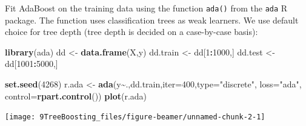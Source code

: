 \documentclass[
  10pt,
  ignorenonframetext,
]{beamer}
\newenvironment{Shaded}{\begin{snugshade}}{\end{snugshade}}
\newcommand{\AttributeTok}[1]{\textcolor[rgb]{0.13,0.29,0.53}{#1}}
\newcommand{\DecValTok}[1]{\textcolor[rgb]{0.00,0.00,0.81}{#1}}
\newcommand{\FunctionTok}[1]{\textcolor[rgb]{0.13,0.29,0.53}{\textbf{#1}}}
\newcommand{\NormalTok}[1]{#1}
\newcommand{\OtherTok}[1]{\textcolor[rgb]{0.56,0.35,0.01}{#1}}
\newcommand{\SpecialCharTok}[1]{\textcolor[rgb]{0.81,0.36,0.00}{\textbf{#1}}}
\newcommand{\StringTok}[1]{\textcolor[rgb]{0.31,0.60,0.02}{#1}}
\begin{document}
\begin{frame}[fragile]
Fit AdaBoost on the training data using the function \texttt{ada()} from
the \texttt{ada} R package. The function uses classification trees as
weak learners. We use default choice for tree depth (tree depth is
decided on a case-by-case basis):

\vspace{2mm}

\scriptsize
\centering

\begin{Shaded}
\begin{Highlighting}[]
\FunctionTok{library}\NormalTok{(ada)}
\NormalTok{dd }\OtherTok{\textless{}{-}} \FunctionTok{data.frame}\NormalTok{(X,y)}
\NormalTok{dd.train }\OtherTok{\textless{}{-}}\NormalTok{ dd[}\DecValTok{1}\SpecialCharTok{:}\DecValTok{1000}\NormalTok{,]}
\NormalTok{dd.test }\OtherTok{\textless{}{-}}\NormalTok{ dd[}\DecValTok{1001}\SpecialCharTok{:}\DecValTok{5000}\NormalTok{,]}

\FunctionTok{set.seed}\NormalTok{(}\DecValTok{4268}\NormalTok{)}
\NormalTok{r.ada }\OtherTok{\textless{}{-}} \FunctionTok{ada}\NormalTok{(y}\SpecialCharTok{\textasciitilde{}}\NormalTok{.,dd.train,}\AttributeTok{iter=}\DecValTok{400}\NormalTok{,}\AttributeTok{type=}\StringTok{"discrete"}\NormalTok{, }\AttributeTok{loss=}\StringTok{"ada"}\NormalTok{, }\AttributeTok{control=}\FunctionTok{rpart.control}\NormalTok{())}
\FunctionTok{plot}\NormalTok{(r.ada)}
\end{Highlighting}
\end{Shaded}

\texttt{[image: 9TreeBoosting\_files/figure-beamer/unnamed-chunk-2-1]}
\end{frame}
\end{document}
